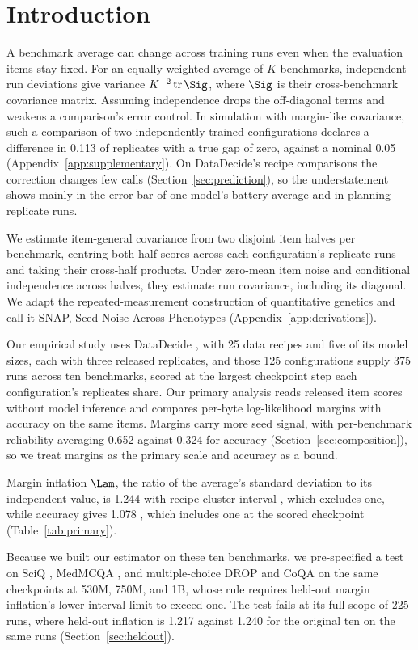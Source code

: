 \section{Introduction}
A benchmark average can change across training runs even when the evaluation items stay fixed. For an equally weighted average of $K$ benchmarks, independent run deviations give variance $K^{-2}\operatorname{tr}\Sig$, where $\Sig$ is their cross-benchmark covariance matrix. Assuming independence drops the off-diagonal terms and weakens a comparison's error control. In simulation with margin-like covariance, such a comparison of two independently trained configurations declares a difference in 0.113 of replicates with a true gap of zero, against a nominal 0.05 (Appendix~\ref{app:supplementary}). On DataDecide's recipe comparisons the correction changes few calls (Section~\ref{sec:prediction}), so the understatement shows mainly in the error bar of one model's battery average and in planning replicate runs.

We estimate item-general covariance from two disjoint item halves per benchmark, centring both half scores across each configuration's replicate runs and taking their cross-half products. Under zero-mean item noise and conditional independence across halves, they estimate run covariance, including its diagonal. We adapt the repeated-measurement construction of quantitative genetics and call it SNAP, Seed Noise Across Phenotypes (Appendix~\ref{app:derivations}).

Our empirical study uses DataDecide \citep{magnusson2025}, with 25 data recipes and five of its model sizes, each with three released replicates, and those 125 configurations supply 375 runs across ten benchmarks, scored at the largest checkpoint step each configuration's replicates share. Our primary analysis reads released item scores without model inference and compares per-byte log-likelihood margins with accuracy on the same items. Margins carry more seed signal, with per-benchmark reliability averaging 0.652 against 0.324 for accuracy (Section~\ref{sec:composition}), so we treat margins as the primary scale and accuracy as a bound.

Margin inflation $\Lam$, the ratio of the average's standard deviation to its independent value, is 1.244 with recipe-cluster interval , which excludes one, while accuracy gives 1.078 , which includes one at the scored checkpoint (Table~\ref{tab:primary}).

Because we built our estimator on these ten benchmarks, we pre-specified a test on SciQ \citep{welbl2017sciq}, MedMCQA \citep{pal2022medmcqa}, and multiple-choice DROP \citep{dua2019drop} and CoQA \citep{reddy2019coqa} on the same checkpoints at 530M, 750M, and 1B, whose rule requires held-out margin inflation's lower interval limit to exceed one. The test fails at its full scope of 225 runs, where held-out inflation is 1.217  against 1.240  for the original ten on the same runs (Section~\ref{sec:heldout}).

